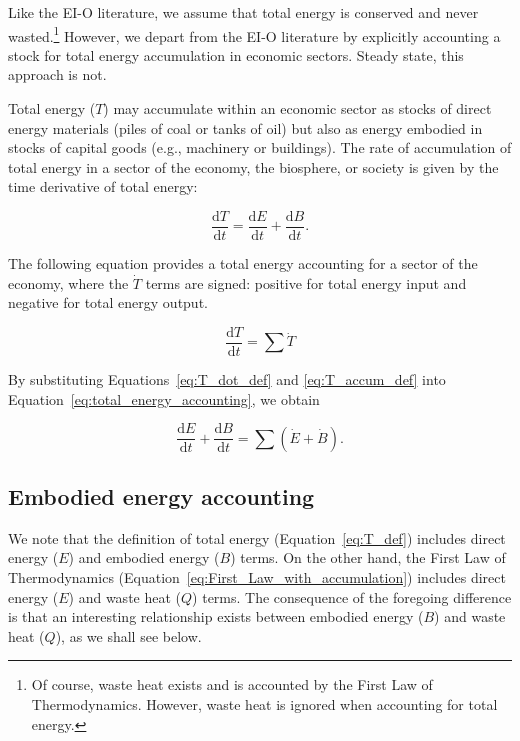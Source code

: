 Like the EI-O literature, we assume that total energy is conserved
and never wasted.\footnote{Of course, waste heat exists and is
accounted by the First Law of Thermodynamics. However,
waste heat is ignored when accounting for total energy.}
However, we depart from the EI-O literature by explicitly
accounting a stock for total energy accumulation in economic sectors. 
Steady state, this approach is not.

Total energy ($T$) may accumulate within an economic sector 
as stocks of direct energy materials 
(piles of coal or tanks of oil) 
but also as energy embodied in stocks of capital goods 
(e.g., machinery or buildings). 
The rate of accumulation of total energy 
in a sector of the economy, the biosphere, 
or society is given by the time derivative of total energy:

\begin{equation} \label{eq:T_accum_def}
	\frac{\mathrm{d}T}{\mathrm{d}t} 
	= \frac{\mathrm{d}E}{\mathrm{d}t} 
	+ \frac{\mathrm{d}B}{\mathrm{d}t}.
\end{equation}

The following equation provides a total energy accounting 
for a sector of the economy, where the $\dot{T}$ terms
are signed: positive for total energy input and negative
for total energy output.

\begin{equation} \label{eq:total_energy_accounting}
		\frac{\mathrm{d}T}{\mathrm{d}t}
		= \sum \dot{T}
\end{equation}

By substituting Equations~\ref{eq:T_dot_def} and
\ref{eq:T_accum_def} into 
Equation~\ref{eq:total_energy_accounting},
we obtain

\begin{equation} \label{eq:total_energy_accounting_details}
	\frac{\mathrm{d}E}{\mathrm{d}t} 
	+ \frac{\mathrm{d}B}{\mathrm{d}t}
	= \sum{\left( \dot{E} 
			+ \dot{B} \right)}.
\end{equation}


\subsection{Embodied energy accounting}

We note that the definition of total energy 
(Equation~\ref{eq:T_def}) includes direct energy ($E$) 
and embodied energy ($B$) terms. 
On the other hand, the First Law of Thermodynamics 
(Equation~\ref{eq:First_Law_with_accumulation})
includes direct energy ($E$) and waste heat ($Q$) terms. 
The consequence of the foregoing difference is that 
an interesting relationship exists between embodied energy ($B$) 
and waste heat ($Q$), as we shall see below. 

